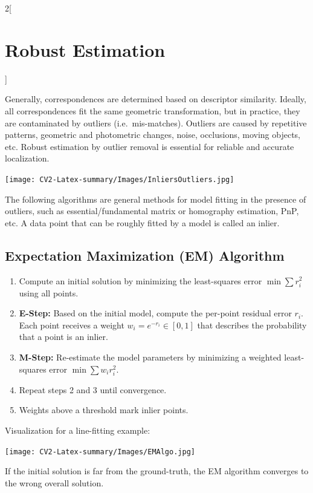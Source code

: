 \documentclass[oneside,fontsize=11pt,paper=a4]{scrartcl}
\begin{document}
\newpage




\begin{multicols}{2}[\section{Robust Estimation}]

Generally, correspondences are determined based on descriptor similarity. Ideally, all correspondences fit the same geometric transformation, but in practice, they are contaminated by outliers (i.e.\ mis-matches). Outliers are caused by repetitive patterns, geometric and photometric changes, noise, occlusions, moving objects, etc. Robust estimation by outlier removal is essential for reliable and accurate localization. 

\begin{center}
    \texttt{[image: CV2-Latex-summary/Images/InliersOutliers.jpg]}
\end{center}

The following algorithms are general methods for model fitting in the presence of outliers, such as essential/fundamental matrix or homography estimation, PnP, etc. A data point that can be roughly fitted by a model is called an inlier.

\subsection{Expectation Maximization (EM) Algorithm}
\begin{enumerate}
    \item Compute an initial solution by minimizing the least-squares error $\min\sum r^2_i$ using all points. 
    \item \textbf{E-Step:} Based on the initial model, compute the per-point residual error $r_i$. Each point receives a weight $w_i=e^{-r_i}\in[0, 1]$ that describes the probability that a point is an inlier.
    \item \textbf{M-Step:} Re-estimate the model parameters by minimizing a weighted least-squares error $\min\sum w_i r^2_i$. 
    \item Repeat steps 2 and 3 until convergence.
    \item Weights above a threshold mark inlier points.
\end{enumerate}
Visualization for a line-fitting example:
\begin{center}
    \texttt{[image: CV2-Latex-summary/Images/EMAlgo.jpg]}
\end{center}
If the initial solution is far from the ground-truth, the EM algorithm converges to the wrong overall solution.


\end{multicols}
\end{document}
